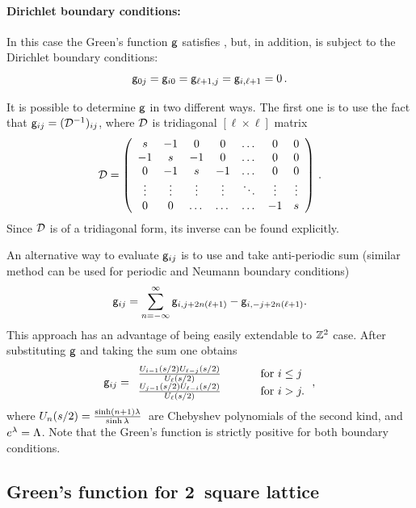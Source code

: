 \documentclass[12pt]{iopart}
\begin{document}
\medskip

\paragraph{Dirichlet boundary conditions:}
In this case the Green's function $\mathsf{g}$  satisfies
, but,  in addition, is subject to the  Dirichlet
boundary conditions:
\[ \mathsf{g}_{0j} = \mathsf{g}_{i0}= \mathsf{g}_{\ell +1,j} = \mathsf{g}_{i,\ell+1}=0
\,.
\]

It is possible to determine $\mathsf{g}$ in two different ways.
The first one  is to use  the fact that $ \mathsf{g}_{ij}=(\mathcal{D}^{-1})_{ij}$, where
$ \mathcal{D}$ is tridiagonal $[\ell\!\times\!\ell]$ matrix
\[\mathcal{D}= \left(\begin{array}{ccccccc}
s & -1 & 0 & 0 &\dots &0&0 \\
-1 & s & -1 & 0 &\dots &0&0 \\
0 & -1 & s & -1  &\dots &0 & 0 \\
\vdots & \vdots &\vdots & \vdots & \ddots &\vdots &\vdots\\
0 & 0 & \dots &  \dots &\dots &-1 & s  \end{array} \right )
\,.
\]
Since $\mathcal{D}$ is of a tridiagonal form,  its inverse can be  found explicitly.

An alternative  way to evaluate   $\mathsf{g}_{ij}$   is to use  and take anti-periodic sum (similar
method can be used for  periodic and Neumann  boundary conditions)
\[   \mathsf{g}_{ij}=\sum_{n=-\infty}^{\infty} \mathsf{g}_{i,j+2 n(\ell+1)}- \mathsf{g}_{i,-j+2 n(\ell+1)}. \]
This approach has an advantage of being  easily extendable  to
$\mathbb{Z}^2$ case. After substituting $\mathsf{g}$ and taking the sum one
obtains
\begin{equation}
 \mathsf{g}_{ij}=  \begin{array}{ll}
        \frac{U_{i-1}(s/2)U_{\ell-j}(s/2)}{U_{\ell}(s/2)} \hspace*{25pt} &\mbox{for } i\leq j\\
        \frac{U_{j-1}(s/2)U_{\ell-i}(s/2)}{U_{\ell}(s/2)} \hspace*{25pt} &\mbox{for } i> j .
        \end{array}
\,,
\label{BGtempCatGF}
\end{equation}
where \(
U_n(s/2)=\frac{\sinh (n+1)\lambda}{\sinh \lambda}
\,
\)
are Chebyshev polynomials of the second kind, and  $e^{\lambda}=\Lambda$.
Note that the Green's function is strictly positive for both boundary
conditions.

\subsection{Green's  function for 2\dmn\ square lattice}
\label{sect:Green2D}
\end{document}
